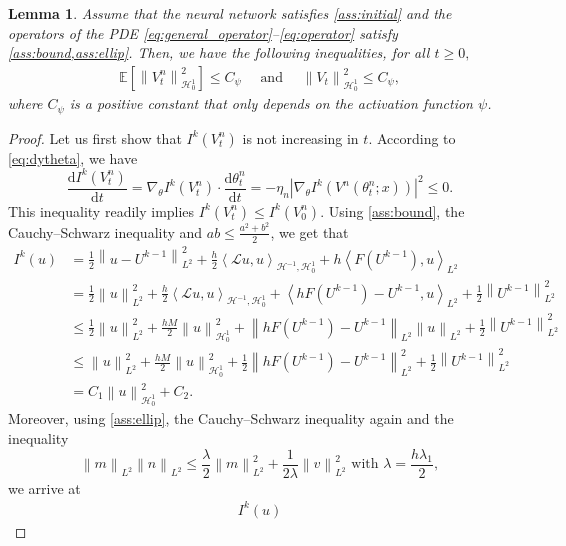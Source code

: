 \documentclass[11pt,a4paper,reqno]{amsart}
\numberwithin{equation}{section}
\theoremstyle{plain}
\newtheorem{lemma}[theorem]{Lemma}
\theoremstyle{definition}
\def\ud{\mathrm d}
\newcommand{\ip}[1]{\left\langle#1\right\rangle}
\newcommand{\E}{\mathbb{E}}
\newcommand{\cL}{\mathcal{L}}
\newcommand{\cH}{\mathcal{H}}
\newcommand{\norm}[1]{\left\|#1 \right\|} %
\newcommand{\abs}[1]{\left|#1\right|} %
\begin{document}
\begin{lemma}
\label{lem:EVtN}
Assume that the neural network satisfies \cref{ass:initial} and the operators of the PDE \eqref{eq:general_operator}--\eqref{eq:operator} satisfy \cref{ass:bound,ass:ellip}.
Then, we have the following inequalities, for all $t\ge 0,$
\begin{align*}
\E \left[ \norm{V^n_t}_{\cH_0^1 }^2 \right] \le C_\psi 
    \quad \text{ and } \quad 
\norm{V_t}^2_{\cH_0^1} \le C_\psi ,
\end{align*}
where $C_\psi$ is a positive constant that only depends on the activation function $\psi$.
\end{lemma} 

\begin{proof}
Let us first show that $I^k \left( V_t^n \right)$ is not increasing in $t$. 
According to \eqref{eq:dytheta}, we have
\[
    \frac{\ud I^k \left( V_t^n \right)}{\ud t} 
        = \nabla_\theta I^k \left( V_t^n \right) \cdot\frac{\ud \theta_t^n}{\ud t} 
        = - \eta_n\abs{\nabla_\theta I^k \left( V^n \left( \theta_t^n; x \right) \right)}^2
        \le 0.
\]
This inequality readily implies $ I^k \left( V_t^n \right)\le I^k \left( V_0^n \right)$. 
Using \cref{ass:bound}, the Cauchy--Schwarz inequality and $ab \leq \frac{a^2 + b^2}{2}$, we get that
\begin{align*}
I^k (u) 
    &= \frac{1}{2}\norm{ u - U^{k - 1}}_{L^2}^2 + \frac{h}{2}\ip{\cL u,u}_{\cH^{-1},\cH_0^1} + h\ip{F \left( U^{k - 1} \right), u}_{L^2}  \\ 
    &= \frac{1}{2}\norm{u}^2_{L^2}+ \frac{h}{2}\ip{\cL u,u}_{\cH^{-1},\cH_0^1} + \ip{hF \left( U^{k - 1}\right) -U^{k-1}, u}_{L^2}+\frac{1}{2}\norm{U^{k-1}}_{L^2}^2\\ 
    &\leq \frac{1}{2}\norm{u}^2_{L^2}+ \frac{hM}{2}\norm{u}^2_{\cH_0^1}+\norm{hF(U^{k-1})-U^{k-1}}_{L^2} \norm{u}_{L^2}+\frac{1}{2} \norm{U^{k-1}}_{L^2}^2 \\ 
    &\leq   \norm{u}^2_{L^2}+ \frac{hM}{2}\norm{u}^2_{\cH_0^1} + \frac{1}{2} \norm{hF(U^{k-1})-U^{k-1}}_{L^2}^2+\frac{1}{2}\norm{U^{k-1}}_{L^2}^2\\
    &= C_1 \norm{u}_{\cH_0^1 }^2 + C_2.
 \end{align*}
Moreover, using \cref{ass:ellip}, the Cauchy--Schwarz inequality again and the inequality 
\[
    \norm{m}_{L^2} \norm{n}_{L^2} \leq \frac{\lambda}{2} \norm{m}_{L^2}^2 + \frac{1}{2 \lambda} \norm{v}_{L^2}^2 
        \text{ with } \lambda = \frac{h \lambda_1}{2},
\]
we arrive at
\begin{align*}
I^k (u) 

\end{align*}
\end{proof}
\end{document}
